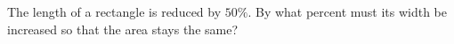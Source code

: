 The length of a rectangle is reduced by $50\%$. By what percent must its width be increased so that the area stays the same?

